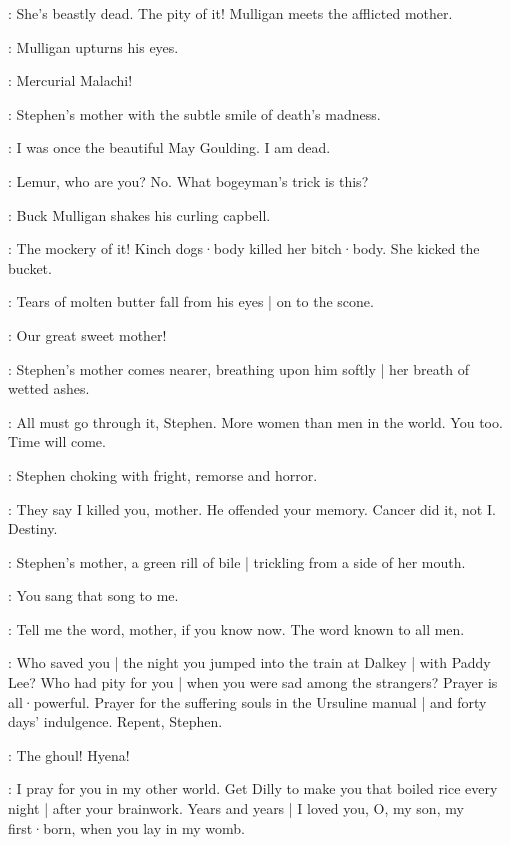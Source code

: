 \BuckMulligan:
She's beastly dead.
The pity of it!
%
Mulligan meets the afflicted mother.

:
Mulligan upturns his eyes.

\BuckMulligan:
Mercurial Malachi!

:
Stephen's mother with the subtle smile of death's madness.

\Mother:
I was once the beautiful May Goulding.
I am dead.

\Stephen:
Lemur,
who are you?
No. What bogeyman's trick is this?

:
Buck Mulligan shakes his curling capbell.

\BuckMulligan:
The mockery of it!
Kinch dogs·body killed her bitch·body.
She kicked the bucket.

:
Tears of molten butter fall from his eyes |
on to the scone.

\BuckMulligan:
Our great sweet mother!

:
Stephen's mother comes nearer,
breathing upon him softly |
her breath of wetted ashes.

\Mother:
All must go through it,
Stephen.
More women than men in the world.
You too.
Time will come.

:
Stephen choking with fright,
remorse and horror.

\Stephen:
They say I killed you,
mother.
He offended your memory.
Cancer did it,
not I.
Destiny.

:
Stephen's mother,
a green rill of bile |
trickling from a side of her mouth.

\Mother:
You sang that song to me.

\Stephen:
Tell me the word,
mother,
if you know now.
The word known to all men.

\Mother:
Who saved you |
the night you jumped into the train at Dalkey |
with Paddy Lee?
Who had pity for you |
when you were sad among the strangers?
Prayer is all·powerful.
Prayer for the suffering souls in the Ursuline manual |
and forty days' indulgence.
Repent,
Stephen.

\Stephen:
The ghoul!
%
Hyena!

\Mother:
I pray for you in my other world.
Get Dilly to make you that boiled rice every night |
after your brainwork.
Years and years |
I loved you,
O,
my son,
my first·born,
when you lay in my womb.

